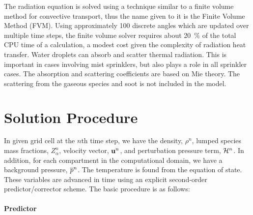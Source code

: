 The radiation equation is solved using a technique similar to a finite
volume method for convective transport, thus the name given to it is
the Finite Volume Method (FVM). Using approximately 100 discrete
angles which are updated over multiple time steps, the finite volume solver requires about 20~\% of the total CPU
time of a calculation, a modest cost given the complexity of radiation
heat transfer.  Water droplets can absorb and scatter thermal
radiation. This is important in cases involving mist sprinklers, but
also plays a role in all sprinkler cases. The absorption and
scattering coefficients are based on Mie theory. The scattering from
the gaseous species and soot is not included in the model.



\section{Solution Procedure}

In given grid cell at the $n$th time step, we have the density, $\rho^n$, lumped species mass fractions, $Z_\alpha^n$, velocity
vector, ${\bf u}^n$, and perturbation pressure term, ${\cal H}^n$.
In addition, for each compartment in the computational domain, we have a background pressure, $\overline{p}^n$. The temperature is
found from the equation of state. These variables are advanced in time using an explicit second-order predictor/corrector scheme.
The basic procedure is as follows:

\paragraph{Predictor}

